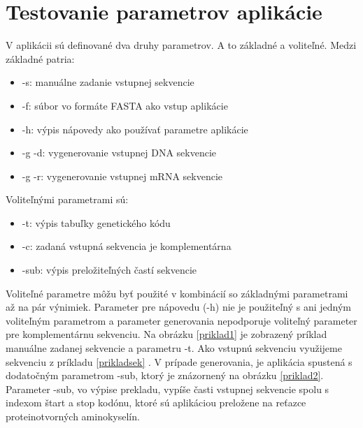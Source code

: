 \section{Testovanie parametrov aplikácie}
V aplikácii sú definované dva druhy parametrov. A to základné a voliteľné. Medzi základné patria:
\begin{itemize}
\item -s: manuálne zadanie vstupnej sekvencie
\item -f: súbor vo formáte FASTA ako vstup aplikácie
\item -h: výpis nápovedy ako používať parametre aplikácie
\item -g -d: vygenerovanie vstupnej DNA sekvencie
\item -g -r: vygenerovanie vstupnej mRNA sekvencie
\end{itemize}
Voliteľnými parametrami sú:
\begin{itemize}
\item -t: výpis tabuľky genetického kódu
\item -c: zadaná vstupná sekvencia je komplementárna
\item -sub: výpis preložiteľných častí sekvencie
\end{itemize}
Voliteľné parametre môžu byť použité v kombinácií so základnými parametrami až na pár výnimiek. Parameter pre nápovedu (-h) nie je použiteľný s ani jedným voliteľným parametrom a parameter generovania nepodporuje voliteľný parameter pre komplementárnu sekvenciu. Na obrázku \ref{priklad1} je zobrazený príklad manuálne zadanej sekvencie a parametru -t. Ako vstupnú sekvenciu využijeme sekvenciu z príkladu \ref{prikladsek} . V prípade generovania, je aplikácia spustená s dodatočným parametrom -sub, ktorý je znázornený na obrázku \ref{priklad2}. Parameter -sub, vo výpise prekladu, vypíše časti vstupnej sekvencie spolu s indexom štart a stop kodónu, ktoré sú aplikáciou preložene na reťazce proteinotvorných aminokyselín. 


